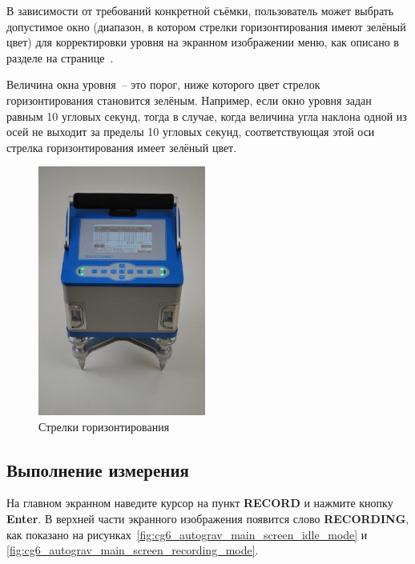 В зависимости от требований конкретной съёмки, пользователь может выбрать
допустимое окно (диапазон, в котором стрелки горизонтирования имеют зелёный
цвет) для корректировки уровня на экранном изображении меню, как описано в
разделе  на
странице~\pageref{subsec:adjusting_the_level_window}.

Величина окна уровня~-- это порог, ниже которого цвет стрелок
горизонтирования становится зелёным. Например, если окно уровня задан равным
10 угловых секунд, тогда в случае, когда величина угла наклона одной из осей не
выходит за пределы \textpm{}10 угловых секунд, соответствующая этой оси стрелка
горизонтирования имеет зелёный цвет.


\begin{figure}[h]
  \centering
  \includegraphics[width=0.49\textwidth]{figures/leveling_arrows}
  \caption{Стрелки горизонтирования}
  \label{fig:leveling_arrows}
\end{figure}


\subsection{Выполнение измерения}

На главном экранном наведите курсор на пункт \textbf{RECORD} и нажмите кнопку
\textbf{Enter}. В верхней части экранного изображения появится слово
\textbf{RECORDING}, как показано на
рисунках~\ref{fig:cg6_autograv_main_screen_idle_mode} и
\ref{fig:cg6_autograv_main_screen_recording_mode}.

